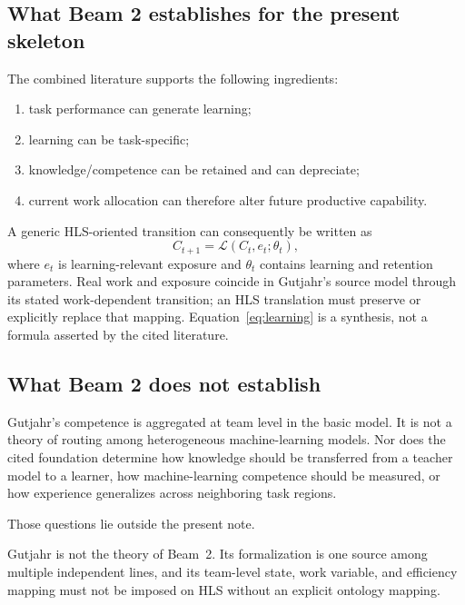 \subsection{What Beam 2 establishes for the present skeleton}

The combined literature supports the following ingredients:
\begin{enumerate}
\item task performance can generate learning;
\item learning can be task-specific;
\item knowledge/competence can be retained and can depreciate;
\item current work allocation can therefore alter future productive capability.
\end{enumerate}

A generic HLS-oriented transition can consequently be written as
\begin{equation}
C_{t+1}=\mathcal{L}(C_t,e_t;\theta_t),
\label{eq:learning}
\end{equation}
where \(e_t\) is learning-relevant exposure and \(\theta_t\) contains learning and retention
parameters. Real work and exposure coincide in Gutjahr's source model through its stated
work-dependent transition; an HLS translation must preserve or explicitly replace that
mapping. Equation~\eqref{eq:learning} is a synthesis, not a formula asserted by the cited
literature.

\subsection{What Beam 2 does not establish}

Gutjahr's competence is aggregated at team level in the basic model. It is not a theory of
routing among heterogeneous machine-learning models. Nor does the cited foundation determine
how knowledge should be transferred from a teacher model to a learner, how machine-learning
competence should be measured, or how experience generalizes across neighboring task regions.

Those questions lie outside the present note.

Gutjahr is not the theory of Beam~2. Its formalization is one source among multiple
independent lines, and its team-level state, work variable, and efficiency mapping must not
be imposed on HLS without an explicit ontology mapping.
